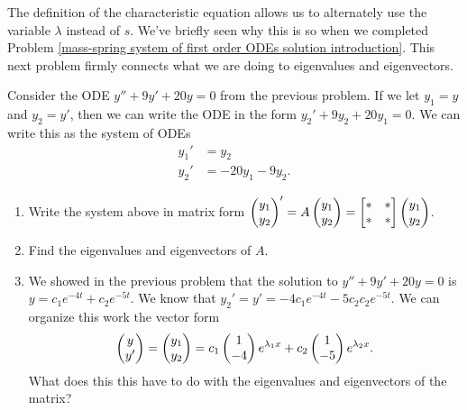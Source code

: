 The definition of the characteristic equation allows us to alternately use the variable $\lambda$ instead of $s$.  We've briefly seen why this is so when we completed Problem \ref{mass-spring system of first order ODEs solution introduction}.
This next problem firmly connects what we are doing to eigenvalues and eigenvectors. 
\begin{problem}
 Consider the ODE $y''+9y'+20y=0$ from the previous problem.  If we let $y_1=y$ and $y_2=y'$, then we can write the ODE in the form $y_2'+9y_2+20y_1=0$.  We can write this as the system of ODEs
\begin{align*}
 y_1'&=y_2\\
 y_2'&=-20y_1-9y_2.
\end{align*}
\begin{enumerate}
 \item 
{}%
Write the system above in matrix form $\begin{pmatrix} y_1\\y_2 \end{pmatrix}' = A \begin{pmatrix} y_1\\y_2 \end{pmatrix} = \begin{bmatrix} *&*\\ *&* \end{bmatrix}\begin{pmatrix} y_1\\y_2 \end{pmatrix}$. 
\item Find the eigenvalues and eigenvectors of $A$.
\item We showed in the previous problem that the solution to $y''+9y'+20y=0$ is $y=c_1e^{-4t}+c_2e^{-5t}$.  
We know that $y_2'=y' = -4c_1e^{-4t}-5c_2 c_2e^{-5t}$.  We can organize this work the vector form 
$$\begin{pmatrix} y\\y' \end{pmatrix}=\begin{pmatrix} y_1\\y_2 \end{pmatrix} = c_1\begin{pmatrix} 1\\ -4 \end{pmatrix}e^{\lambda _1 x}+c_2\begin{pmatrix} 1\\ -5 \end{pmatrix}e^{\lambda_2 x}.$$
What does this this have to do with the eigenvalues and eigenvectors of the matrix?
\end{enumerate}
\end{problem}





















